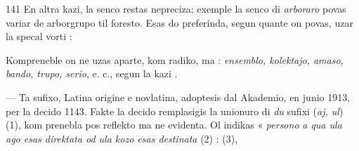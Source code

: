 \begin{VUpage}[145]{141}
En altra kazi, la senco restas nepreciza; exemple la senco\nl
di \textit{arboraro} povas variar de arborgrupo til foresto. Esas do\nl
preferinda, segun quante on povas, uzar la specal vorti :\nl
{}

Kompreneble on ne uzas  aparte, kom radiko, ma :\nl
\textit{ensemblo, kolektajo, amaso, bando, trupo, serio}, e. c., segun\nl
la kazi .

 --- Ta sufixo, Latina origine e novlatina, adoptesis\nl
dal Akademio, en junio 1913, per la decido 1143. Fakte la\nl
decido remplasigis la unionuro di \textit{du} sufixi (\textit{aj, ul}) (1), kom\cc
prenebla pos reflekto ma ne evidenta. Ol indikas « \textit{persono}\nl
\textit{a qua ula ago esas direktata od ula kozo esas destinata} (2) :\nl
{} (3), \parplein
\end{VUpage}

